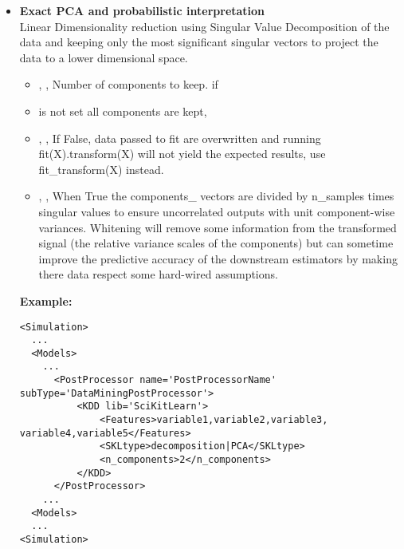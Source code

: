\begin{itemize}
	\item \textbf{Exact PCA and probabilistic interpretation} \\
	Linear Dimensionality reduction using Singular Value Decomposition of
	the data and keeping only the most significant singular vectors to
	 project the data to a lower dimensional space.
	\begin{itemize}
		\item {}, , Number of components to keep. if
		\item {} is not set all components are kept,
		\item {}, , If False,
		 data passed to fit are overwritten and running fit(X).transform(X)
 		will not yield the expected results, use fit\_transform(X) instead.
		\item {}, , When True
		the components\_ vectors are divided by n\_samples times singular
		 values to ensure uncorrelated outputs with unit component-wise
		variances. Whitening will remove some information from the transformed
		 signal (the relative variance scales of the components) but can
		sometime improve the predictive accuracy of the downstream estimators
		 by making there data respect some hard-wired assumptions. 
	\end{itemize}		
\textbf{Example:}
\begin{lstlisting}[style=XML,morekeywords={subType}]
<Simulation>
  ...
  <Models>
    ...
      <PostProcessor name='PostProcessorName' subType='DataMiningPostProcessor'>
          <KDD lib='SciKitLearn'>
              <Features>variable1,variable2,variable3, variable4,variable5</Features>
              <SKLtype>decomposition|PCA</SKLtype>
              <n_components>2</n_components>
          </KDD>
      </PostProcessor>
    ...
  <Models>
  ...
<Simulation>
\end{lstlisting}



\end{itemize}
